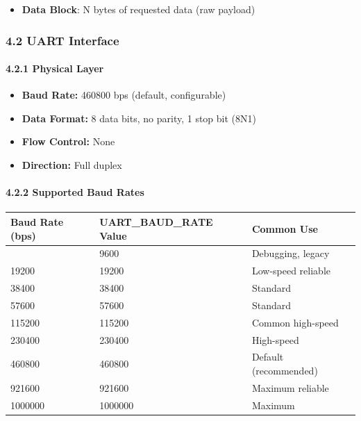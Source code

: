 \documentclass[
  11pt,
]{article}
\newcounter{none} %
\providecommand{\tightlist}{%
  \setlength{\itemsep}{0pt}\setlength{\parskip}{0pt}}
\begin{document}
\begin{itemize}
\tightlist
\item
  \textbf{Data Block}: N bytes of requested data (raw payload)
\end{itemize}

\subsubsection{4.2 UART Interface}\label{uart-interface}

\paragraph{4.2.1 Physical Layer}\label{physical-layer-1}

\begin{itemize}
\tightlist
\item
  \textbf{Baud Rate:} 460800 bps (default, configurable)
\item
  \textbf{Data Format:} 8 data bits, no parity, 1 stop bit (8N1)
\item
  \textbf{Flow Control:} None
\item
  \textbf{Direction:} Full duplex
\end{itemize}

\paragraph{4.2.2 Supported Baud Rates}\label{supported-baud-rates}

{\def\LTcaptype{none} %
\begin{longtable}[]{@{}lll@{}}
\toprule\noalign{}
Baud Rate (bps) & UART\_BAUD\_RATE Value & Common Use \\
\midrule\noalign{}
\endhead
\bottomrule\noalign{}
\endlastfoot
9600 & 9600 & Debugging, legacy \\
19200 & 19200 & Low-speed reliable \\
38400 & 38400 & Standard \\
57600 & 57600 & Standard \\
115200 & 115200 & Common high-speed \\
230400 & 230400 & High-speed \\
460800 & 460800 & Default (recommended) \\
921600 & 921600 & Maximum reliable \\
1000000 & 1000000 & Maximum \\
\end{longtable}
}
\end{document}
